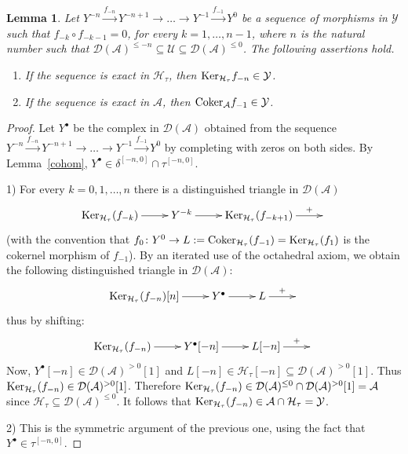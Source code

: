 \documentclass{proc-l}
\newtheorem{lemma}[theorem]{Lemma}
\theoremstyle{definition}
\theoremstyle{remark}
\numberwithin{equation}{section}
\begin{document}
\begin{lemma}\label{lemma0}
Let $Y^{-n}\stackrel{f_{-n}}\to Y^{-n+1}\to \dots \to Y^{-1}\stackrel{f_{-1}}\to Y^0$ be a sequence of morphisms in 
$\mathcal{Y}$ such that $f_{-k}\circ f_{-k-1}=0$, for every $k=1,\dots, n-1$, where $n$ is the natural number such that $\mathcal{D}(\mathcal{A})^{\leq-n}\subseteq \mathcal{U} \subseteq \mathcal{D}(\mathcal{A})^{\leq0}$. The following assertions hold.
\begin{enumerate}
\item If the sequence is exact in $\mathcal{H}_\tau$, then ${\rm Ker}_{\mathcal{H}_\tau}f_{-n} \in \mathcal{Y}$.
\item If the sequence is exact in $\mathcal{A}$, then ${\rm Coker}_\mathcal{A}f_{-1} \in \mathcal{Y}$.
\end{enumerate}
\end{lemma}
\begin{proof}
Let $Y^\bullet$ be the complex in $\mathcal{D}(\mathcal{A})$ obtained from the sequence 
$Y^{-n}\stackrel{f_{-n}}\to Y^{-n+1}\to \dots \to Y^{-1}\stackrel{f_{-1}}\to Y^0$ by completing with zeros on both sides. By Lemma~\ref{cohom}, $Y^\bullet \in \delta^{[-n,0]} \cap \tau^{[-n,0]}$.

1) For every $k=0,1,\dots,n$ there is a distinguished triangle in $\mathcal{D}(\mathcal{A})$
\[
\xymatrix{{\rm Ker}_{\mathcal{H}_\tau}(f_{-k})\ar[r]& Y^{-k}\ar[r]& {\rm Ker}_{\mathcal{H}_\tau}(f_{-k+1})\ar^-{+}[r]&}
\]
(with the convention that $f_0 \colon Y^0 \to L:={\rm Coker}_{\mathcal{H}_\tau}(f_{-1})=\text{Ker}_{\mathcal{H}_\tau}(f_1)$ is the cokernel morphism of $f_{-1}$). By an iterated use of the octahedral axiom, we obtain the following distinguished triangle in $\mathcal{D}(\mathcal{A})$:
\[
\xymatrix{{\rm Ker}_{\mathcal{H}_\tau}(f_{-n})[n]\ar[r]& Y^\bullet \ar[r]& L\ar^-{+}[r]&}
\]
thus by shifting:
\[
\xymatrix{{\rm Ker}_{\mathcal{H}_\tau}(f_{-n})\ar[r]& Y^\bullet[-n] \ar[r]& L[-n]\ar^-{+}[r]&}
\]
Now, $Y^\bullet[-n] \in \mathcal{D}(\mathcal{A})^{>0}[1]$ and 
$L[-n] \in \mathcal{H}_\tau[-n]\subseteq \mathcal{D}(\mathcal{A})^{>0}[1]$. Thus 
${\rm Ker}_{\mathcal{H}_\tau}(f_{-n}) \in \mathcal{D}(\mathcal{A})^{>0}[1]$. Therefore 
${\rm Ker}_{\mathcal{H}_\tau}(f_{-n}) \in \mathcal{D}(\mathcal{A})^{\leq0} \cap \mathcal{D}(\mathcal{A})^{>0}[1]=\mathcal{A}$ since 
$\mathcal{H}_\tau \subseteq \mathcal{D}(\mathcal{A})^{\leq0}$. It follows that 
${\rm Ker}_{\mathcal{H}_\tau}(f_{-n}) \in \mathcal{A}\cap \mathcal{H}_\tau=\mathcal{Y}$.

2) This is the symmetric argument of the previous one, using the fact that $Y^\bullet \in \tau^{[-n,0]}$.
\end{proof}
\end{document}
